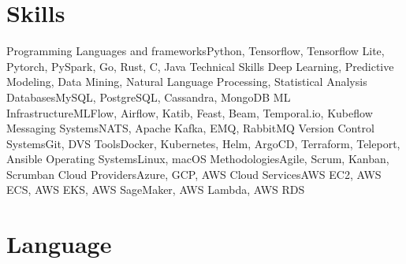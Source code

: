 \section{Skills}

\cvline%
{Programming Languages and frameworks}{Python, Tensorflow, Tensorflow Lite, Pytorch, PySpark, Go, Rust, C, Java}
\cvline%
{Technical Skills} {Deep Learning, Predictive Modeling, Data Mining, Natural Language Processing, Statistical Analysis}
\cvline%
{Databases}{MySQL, PostgreSQL, Cassandra, MongoDB}
\cvline%
{ML Infrastructure}{MLFlow, Airflow, Katib, Feast, Beam, Temporal.io, Kubeflow}
\cvline%
{Messaging Systems}{NATS, Apache Kafka, EMQ, RabbitMQ}
\cvline%
{Version Control Systems}{Git, DVS}
\cvline%
{Tools}{Docker, Kubernetes, Helm, ArgoCD, Terraform, Teleport, Ansible}
\cvline%
{Operating Systems}{Linux, macOS}
\cvline%
{Methodologies}{Agile, Scrum, Kanban, Scrumban}
\cvline%
{Cloud Providers}{Azure, GCP, AWS}
\cvline%
{Cloud Services}{AWS EC2, AWS ECS, AWS EKS, AWS SageMaker, AWS Lambda, AWS RDS}

\section{Language}


\emptysection{}\closesection{}
